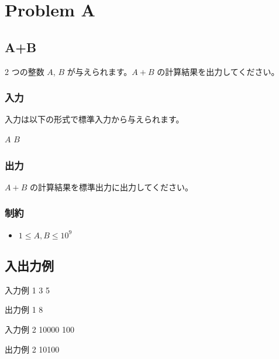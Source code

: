 \documentclass[11pt,a4paper]{article}
\begin{document}
\section{Problem A}

\subsection{A+B}

2 つの整数 $A$, $B$ が与えられます。$A + B$ の計算結果を出力してください。

\subsubsection{入力}

入力は以下の形式で標準入力から与えられます。

\begin{screen}
$A$ $B$
\end{screen}

\subsubsection{出力}

$A + B$ の計算結果を標準出力に出力してください。

\subsubsection{制約}

\begin{itemize}
    \item $1 \leq A, B \leq 10^{9}$
\end{itemize}



\subsection{ 入出力例 }



\begin{itembox}[l]{ 入力例 1 }
3 5

\end{itembox}



\begin{itembox}[l]{ 出力例 1 }
8

\end{itembox}







\begin{itembox}[l]{ 入力例 2 }
10000 100

\end{itembox}



\begin{itembox}[l]{ 出力例 2 }
10100

\end{itembox}
\end{document}
